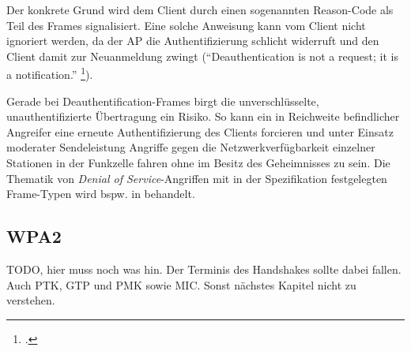 Der konkrete Grund wird dem Client durch einen sogenannten Reason-Code als Teil des Frames signalisiert. Eine solche Anweisung kann vom Client nicht ignoriert werden, da der AP die Authentifizierung schlicht widerruft und den Client damit zur Neuanmeldung zwingt (\enquote{Deauthentication is not a request; it is a notification.} \footcite[S. 74]{ieee802.11}).
 
Gerade bei Deauthentification-Frames birgt die unverschlüsselte, unauthentifizierte Übertragung ein Risiko.
So kann ein in Reichweite befindlicher Angreifer eine erneute Authentifizierung des Clients forcieren und unter Einsatz moderater Sendeleistung Angriffe gegen die Netzwerkverfügbarkeit einzelner Stationen in der Funkzelle fahren ohne im Besitz des Geheimnisses zu sein. Die Thematik von \textit{Denial of Service}-Angriffen mit in der Spezifikation festgelegten Frame-Typen wird bspw. in \cite{bernaschi2008access} behandelt.

\subsection{WPA2}
TODO, hier muss noch was hin. Der Terminis des Handshakes sollte dabei fallen. Auch PTK, GTP und PMK sowie MIC. Sonst nächstes Kapitel nicht zu verstehen.
